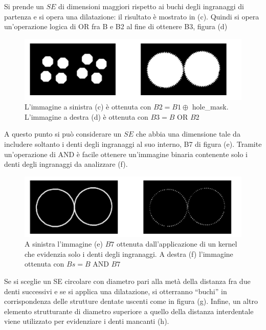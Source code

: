 Si prende un $SE$ di dimensioni maggiori rispetto ai buchi degli ingranaggi di partenza e si opera una dilatazione: il risultato è
mostrato in (c). Quindi si opera un'operazione logica di OR fra B e B2 al fine di ottenere B3, figura (d)

\begin{figure}[H]
    \centering
    \includegraphics[width=\linewidth, keepaspectratio]{capitoli/immagini/imgs/orologi3.png}
    \caption*{L'immagine a sinistra (c) è ottenuta con $B2 = B1 \oplus$ hole\_mask. L'immagine a destra (d) è ottenuta con $B3 = B \text{ OR } B2$}
\end{figure}

A questo punto si può considerare un $SE$ che abbia una dimensione tale da includere soltanto i denti degli ingranaggi al suo interno,
B7 di figura (e). Tramite un'operazione di AND è facile ottenere un'immagine
binaria contenente solo i denti degli ingranaggi da analizzare (f).

\begin{figure}[H]
    \centering
    \includegraphics[width=\linewidth, keepaspectratio]{capitoli/immagini/imgs/orologi4.png}
    \caption{A sinistra l'immagine (e) $B7$ ottenuta dall'applicazione di un kernel che evidenzia solo i denti degli ingranaggi. A destra (f) l'immagine ottenuta con $Bs = B \text{ AND } B7$}
\end{figure}

Se si sceglie un SE circolare con diametro pari alla metà della distanza fra due denti successivi e se si applica una dilatazione, si
otterranno “buchi” in corrispondenza delle strutture dentate uscenti come in figura (g). Infine, un altro elemento strutturante di diametro superiore a
quello della distanza interdentale viene utilizzato per evidenziare i denti mancanti (h).

